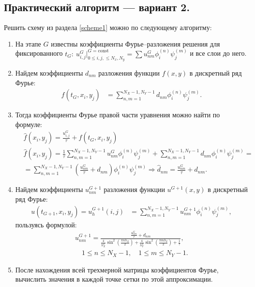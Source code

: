 \documentclass[14pt,a4paper]{extarticle}
\newcommand{\1}{\mathbbm{1}}
\begin{document}
\subsection{Практический алгоритм --- вариант 2.}
Решить схему из раздела \ref{scheme1} можно по следующему алгоритму:
\begin{enumerate}
    \item На этапе $G$ известны коэффициенты Фурье--разложения решения для фиксированного $t_G: \ u_{i, j}^{G} \big|^{G = \text{const}} _{0 \leq i, j, \leq N_x, N_y} = \sum u_{nm}^G \phi ^{(n)}_i \psi ^{(m)}_j$ и все слои до него.
    \item Найдем коэффициенты $d_{nm}$ разложения функции $f(x, y)$ в дискретный ряд Фурье: 
    \begin{align*}
     f(t_G, x_i, y_j)  &= \sum_{n, m = 1}^{N_X-1, N_Y-1} d_{nm} \phi ^{(n)}_i \psi ^{(m)}_j.
    \end{align*}
    \item Тогда коэффициенты Фурье правой части уравнения можно найти по формуле:
    \begin{align*}
     &\hat f(x_i, y_j) = \frac{u^{G}_{i, j}}{\tau} + f(t_G, x_i, y_j) \\
     &\hat f(x_i, y_j) = \frac{1}{\tau} \sum_{n, m = 1}^{N_X-1, N_Y-1}u_{nm}^G \phi ^{(n)}_i \psi ^{(m)}_j  + \sum_{n, m = 1}^{N_X-1, N_Y-1} d_{nm} \phi ^{(n)}_i \psi ^{(m)}_j = \\
     &= \sum_{n, m = 1}^{N_X-1, N_Y-1} \left(\frac{u_{nm}^G}{\tau} + d_{nm}\right) \phi ^{(n)}_i \psi ^{(m)}_j \Rightarrow \hat d_{nm} = \frac{u_{nm}^G}{\tau} + d_{nm}.
    \end{align*}
    \item Найдем коэффициенты $u_{nm}^{G+1}$ разложения функции $u^{G+1}(x, y)$ в дискретный ряд Фурье: 
    \begin{align*}
    u(t_{G+1}, x_i, y_j) = u_h^{G+1}(i, j) &= \sum_{n, m = 1}^{N_X-1, N_Y-1} u_{nm}^{G+1} \phi ^{(n)}_i \psi ^{(m)}_j,
    \end{align*}
    пользуясь формулой:
    \begin{align*}
    u_{nm}^{G+1} = \frac{\frac{u_{nm}^G}{\tau} + d_{nm}}{\frac{4}{h_X^2} \sin ^2\left(\frac{\pi n h_X}{2}\right)
    +  \frac{4}{h_Y^2} \sin ^2\left(\frac{\pi m h_Y}{2}\right) + \frac{1}{\tau}}, \\
    \quad 1 \leq n \leq N_X-1, \quad 1 \leq m \leq N_Y-1.
    \end{align*}
    \item После нахождения всей трехмерной матрицы коэффициентов Фурье, вычислить значения в каждой точке сетки по этой аппроксимации. 
\end{enumerate}
\end{document}
